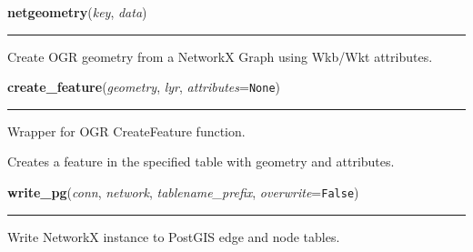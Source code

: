     \label{nx_pg:netgeometry}

    \vspace{0.5ex}

\hspace{.8\funcindent}\begin{boxedminipage}{\funcwidth}

    \raggedright \textbf{netgeometry}(\textit{key}, \textit{data})

    \vspace{-1.5ex}

    \rule{\textwidth}{0.5\fboxrule}
\setlength{\parskip}{2ex}
    Create OGR geometry from a NetworkX Graph using Wkb/Wkt attributes.

\setlength{\parskip}{1ex}
    \end{boxedminipage}

    \label{nx_pg:create_feature}

    \vspace{0.5ex}

\hspace{.8\funcindent}\begin{boxedminipage}{\funcwidth}

    \raggedright \textbf{create\_feature}(\textit{geometry}, \textit{lyr}, \textit{attributes}={\tt None})

    \vspace{-1.5ex}

    \rule{\textwidth}{0.5\fboxrule}
\setlength{\parskip}{2ex}
    Wrapper for OGR CreateFeature function.

    Creates a feature in the specified table with geometry and attributes.

\setlength{\parskip}{1ex}
    \end{boxedminipage}

    \label{nx_pg:write_pg}

    \vspace{0.5ex}

\hspace{.8\funcindent}\begin{boxedminipage}{\funcwidth}

    \raggedright \textbf{write\_pg}(\textit{conn}, \textit{network}, \textit{tablename\_prefix}, \textit{overwrite}={\tt False})

    \vspace{-1.5ex}

    \rule{\textwidth}{0.5\fboxrule}
\setlength{\parskip}{2ex}
    Write NetworkX instance to PostGIS edge and node tables.

\setlength{\parskip}{1ex}
    \end{boxedminipage}


